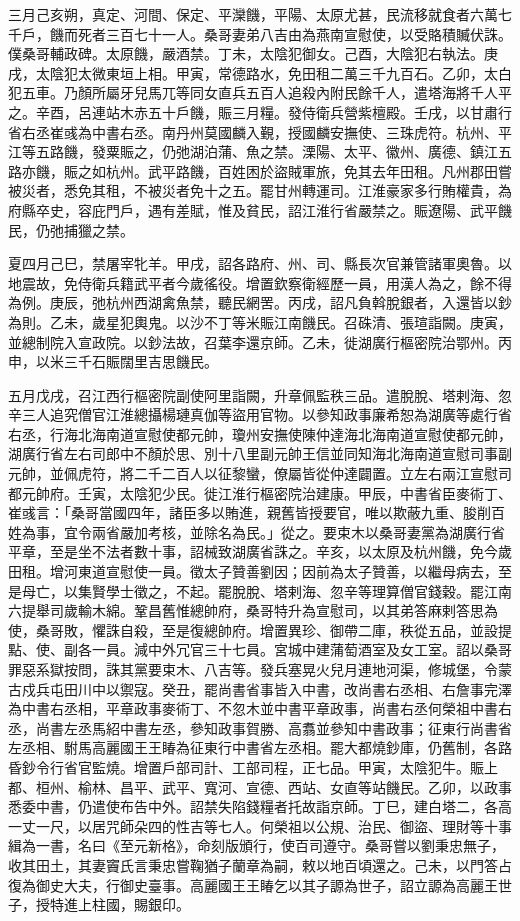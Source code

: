 \begin{pinyinscope}
 三月己亥朔，真定、河間、保定、平灤饑，平陽、太原尤甚，民流移就食者六萬七千戶，饑而死者三百七十一人。桑哥妻弟八吉由為燕南宣慰使，以受賂積贓伏誅。僕桑哥輔政碑。太原饑，嚴酒禁。丁未，太陰犯御女。己酉，大陰犯右執法。庚戌，太陰犯太微東垣上相。甲寅，常德路水，免田租二萬三千九百石。乙卯，太白犯五車。乃顏所屬牙兒馬兀等同女直兵五百人追殺內附民餘千人，遣塔海將千人平之。辛酉，呂連站木赤五十戶饑，賑三月糧。發侍衛兵營紫檀殿。壬戌，以甘肅行省右丞崔彧為中書右丞。南丹州莫國麟入覲，授國麟安撫使、三珠虎符。杭州、平江等五路饑，發粟賑之，仍弛湖泊蒲、魚之禁。溧陽、太平、徽州、廣德、鎮江五路亦饑，賑之如杭州。武平路饑，百姓困於盜賊軍旅，免其去年田租。凡州郡田嘗被災者，悉免其租，不被災者免十之五。罷甘州轉運司。江淮豪家多行賄權貴，為府縣卒史，容庇門戶，遇有差賦，惟及貧民，詔江淮行省嚴禁之。賑遼陽、武平饑民，仍弛捕獵之禁。



 夏四月己巳，禁屠宰牝羊。甲戌，詔各路府、州、司、縣長次官兼管諸軍奧魯。以地震故，免侍衛兵籍武平者今歲徭役。增置欽察衛經歷一員，用漢人為之，餘不得為例。庚辰，弛杭州西湖禽魚禁，聽民網罟。丙戌，詔凡負斡脫銀者，入還皆以鈔為則。乙未，歲星犯輿鬼。以沙不丁等米賑江南饑民。召硃清、張瑄詣闕。庚寅，並總制院入宣政院。以鈔法故，召葉李還京師。乙未，徙湖廣行樞密院治鄂州。丙申，以米三千石賑闊里吉思饑民。



 五月戊戌，召江西行樞密院副使阿里詣闕，升章佩監秩三品。遣脫脫、塔剌海、忽辛三人追究僧官江淮總攝楊璉真伽等盜用官物。以參知政事廉希恕為湖廣等處行省右丞，行海北海南道宣慰使都元帥，瓊州安撫使陳仲達海北海南道宣慰使都元帥，湖廣行省左右司郎中不顏於思、別十八里副元帥王信並同知海北海南道宣慰司事副元帥，並佩虎符，將二千二百人以征黎蠻，僚屬皆從仲達闢置。立左右兩江宣慰司都元帥府。壬寅，太陰犯少民。徙江淮行樞密院治建康。甲辰，中書省臣麥術丁、崔彧言：「桑哥當國四年，諸臣多以賄進，親舊皆授要官，唯以欺蔽九重、朘削百姓為事，宜令兩省嚴加考核，並除名為民。」從之。要束木以桑哥妻黨為湖廣行省平章，至是坐不法者數十事，詔械致湖廣省誅之。辛亥，以太原及杭州饑，免今歲田租。增河東道宣慰使一員。徵太子贊善劉因；因前為太子贊善，以繼母病去，至是母亡，以集賢學士徵之，不起。罷脫脫、塔剌海、忽辛等理算僧官錢穀。罷江南六提舉司歲輸木綿。鞏昌舊惟總帥府，桑哥特升為宣慰司，以其弟答麻剌答思為使，桑哥敗，懼誅自殺，至是復總帥府。增置異珍、御帶二庫，秩從五品，並設提點、使、副各一員。減中外冗官三十七員。宮城中建蒲萄酒室及女工室。詔以桑哥罪惡系獄按問，誅其黨要束木、八吉等。發兵塞晃火兒月連地河渠，修城堡，令蒙古戍兵屯田川中以禦寇。癸丑，罷尚書省事皆入中書，改尚書右丞相、右詹事完澤為中書右丞相，平章政事麥術丁、不忽木並中書平章政事，尚書右丞何榮祖中書右丞，尚書左丞馬紹中書左丞，參知政事賀勝、高翥並參知中書政事；征東行尚書省左丞相、駙馬高麗國王王睶為征東行中書省左丞相。罷大都燒鈔庫，仍舊制，各路昏鈔令行省官監燒。增置戶部司計、工部司程，正七品。甲寅，太陰犯牛。賑上都、桓州、榆林、昌平、武平、寬河、宣德、西站、女直等站饑民。乙卯，以政事悉委中書，仍遣使布告中外。詔禁失陷錢糧者托故詣京師。丁巳，建白塔二，各高一丈一尺，以居咒師朵四的性吉等七人。何榮祖以公規、治民、御盜、理財等十事緝為一書，名曰《至元新格》，命刻版頒行，使百司遵守。桑哥嘗以劉秉忠無子，收其田土，其妻竇氏言秉忠嘗鞠猶子蘭章為嗣，敕以地百頃還之。己未，以門答占復為御史大夫，行御史臺事。高麗國王王睶乞以其子謜為世子，詔立謜為高麗王世子，授特進上柱國，賜銀印。




\end{pinyinscope}

